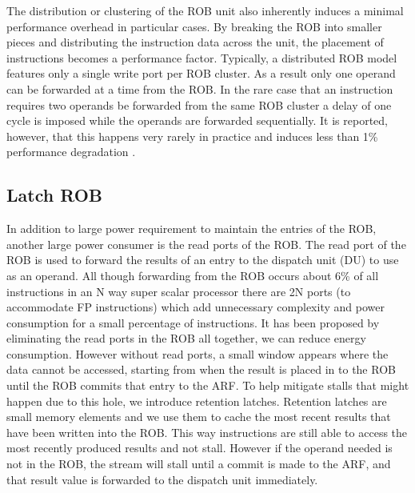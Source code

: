 The distribution or clustering of the ROB unit also inherently induces a minimal performance overhead 
in particular cases.  By breaking the ROB into smaller pieces and distributing the instruction 
data across the unit, the placement of instructions becomes a performance factor.  Typically, a 
distributed ROB model features only a single write port per ROB cluster.  As a result only one operand 
can be forwarded at a time from the ROB.  In the rare case that an instruction requires two operands be 
forwarded from the same ROB cluster a delay of one cycle is imposed while the operands are forwarded 
sequentially.  It is reported, however, that this happens very rarely in practice and induces less than 1\% 
performance degradation \cite{rabaey}.
\subsection{Latch ROB}
In addition to large power requirement to maintain the entries of the ROB, another 
large power consumer is the read ports of the ROB.  The read port of the ROB is used
to forward the results of an entry to the dispatch unit (DU) to use as an operand.
All though forwarding from the ROB occurs about 6\%\cite{kucuk} of all instructions 
in an N way super scalar processor there are 2N ports (to accommodate FP
 instructions) which add unnecessary complexity and power consumption for a small 
percentage of instructions.  It has been proposed by eliminating the read ports 
in the ROB all together, we can reduce energy consumption\cite{kucuk}.  However
without read ports, a small window appears where the data cannot be accessed,
starting from when the result is placed in to the ROB until the ROB commits that 
entry to the ARF.  To help mitigate stalls that might happen due to this hole, 
we introduce retention latches.   Retention latches are small memory elements and 
we use them to cache the most recent results that have been written into the ROB.
This way instructions are still able to access the most recently produced results
and not stall.  However if the operand needed is not in the ROB, the stream will 
stall until a commit is made to the ARF, and that result value is forwarded to 
the dispatch unit immediately.

